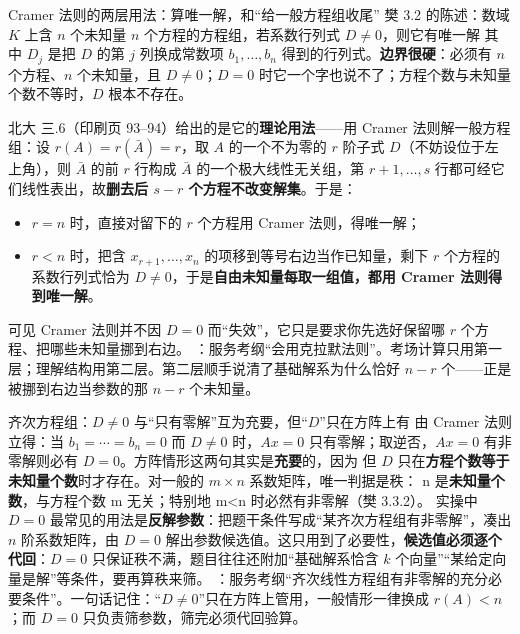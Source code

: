 \begin{fdeep}{Cramer 法则的两层用法：算唯一解，和“给一般方程组收尾”}
樊 3.2 的陈述：数域 $K$ 上含 $n$ 个未知量 $n$ 个方程的方程组，若系数行列式 $D\ne0$，则它有唯一解
其中 $D_j$ 是把 $D$ 的第 $j$ 列换成常数项 $b_1,\dots,b_n$ 得到的行列式。\textbf{边界很硬}：必须有 $n$ 个方程、$n$ 个未知量，且 $D\ne0$；$D=0$ 时它一个字也说不了；方程个数与未知量个数不等时，$D$ 根本不存在。

北大 三.6（印刷页 93–94）给出的是它的\textbf{理论用法}——用 Cramer 法则解一般方程组：设 $r(A)=r(\bar A)=r$，取 $A$ 的一个不为零的 $r$ 阶子式 $D$（不妨设位于左上角），则 $\bar A$ 的前 $r$ 行构成 $\bar A$ 的一个极大线性无关组，第 $r+1,\dots,s$ 行都可经它们线性表出，故\textbf{删去后 $s-r$ 个方程不改变解集}。于是：
\begin{itemize}[leftmargin=2.2em,itemsep=0.25em]
\item $r=n$ 时，直接对留下的 $r$ 个方程用 Cramer 法则，得唯一解；
\item $r<n$ 时，把含 $x_{r+1},\dots,x_n$ 的项移到等号右边当作已知量，剩下 $r$ 个方程的系数行列式恰为 $D\ne0$，于是\textbf{自由未知量每取一组值，都用 Cramer 法则得到唯一解}。
\end{itemize}
可见 Cramer 法则并不因 $D=0$ 而“失效”，它只是要求你先选好保留哪 $r$ 个方程、把哪些未知量挪到右边。
\fbref{}：服务考纲“会用克拉默法则”。考场计算只用第一层；理解结构用第二层。第二层顺手说清了基础解系为什么恰好 $n-r$ 个——正是被挪到右边当参数的那 $n-r$ 个未知量。
\end{fdeep}

\begin{fdeep}{齐次方程组：$D\ne0$ 与“只有零解”互为充要，但“$D$”只在方阵上有}
由 Cramer 法则立得：当 $b_1=\cdots=b_n=0$ 而 $D\ne0$ 时，$Ax=0$ 只有零解；取逆否，$Ax=0$ 有非零解则必有 $D=0$。方阵情形这两句其实是\textbf{充要}的，因为
但 $D$ 只在\textbf{方程个数等于未知量个数}时才存在。对一般的 $m\times n$ 系数矩阵，唯一判据是秩：
 n 是\textbf{未知量个数}，与方程个数 m 无关；特别地 m<n 时必然有非零解（樊 3.3.2）。
实操中 $D=0$ 最常见的用法是\textbf{反解参数}：把题干条件写成“某齐次方程组有非零解”，凑出 $n$ 阶系数矩阵，由 $D=0$ 解出参数候选值。这只用到了必要性，\textbf{候选值必须逐个代回}：$D=0$ 只保证秩不满，题目往往还附加“基础解系恰含 $k$ 个向量”“某给定向量是解”等条件，要再算秩来筛。
\fbref{}：服务考纲“齐次线性方程组有非零解的充分必要条件”。一句话记住：“$D\ne0$”只在方阵上管用，一般情形一律换成 $r(A)<n$；而 $D=0$ 只负责筛参数，筛完必须代回验算。
\end{fdeep}

